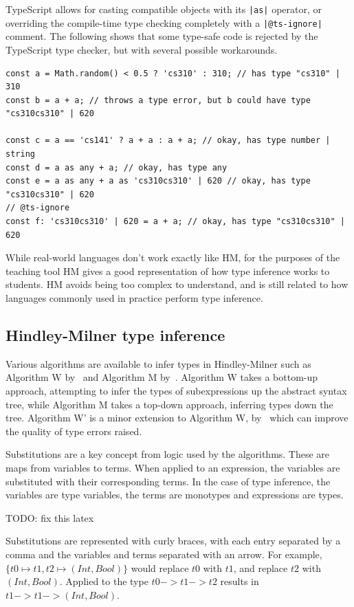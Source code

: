 \documentclass[a4paper,fleqn,12pt]{article}
\begin{document}
TypeScript allows for casting compatible objects with its \texttt{|as|} operator, or overriding the compile-time type checking completely with a \texttt{|@ts-ignore|} comment. The following shows that some type-safe code is rejected by the TypeScript type checker, but with several possible workarounds.

\begin{verbatim}
const a = Math.random() < 0.5 ? 'cs310' : 310; // has type "cs310" | 310
const b = a + a; // throws a type error, but b could have type "cs310cs310" | 620

const c = a == 'cs141' ? a + a : a + a; // okay, has type number | string
const d = a as any + a; // okay, has type any
const e = a as any + a as 'cs310cs310' | 620 // okay, has type "cs310cs310" | 620
// @ts-ignore
const f: 'cs310cs310' | 620 = a + a; // okay, has type "cs310cs310" | 620
\end{verbatim}

While real-world languages don’t work exactly like HM, for the purposes of the teaching tool HM gives a good representation of how type inference works to students. HM avoids being too complex to understand, and is still related to how languages commonly used in practice perform type inference.
\subsection{Hindley-Milner type inference}\label{id:h.admfqf7bhkct}
Various algorithms are available to infer types in Hindley-Milner such as Algorithm W by~\cite{ref26} and Algorithm M by~\cite{ref27}. Algorithm W takes a bottom-up approach, attempting to infer the types of subexpressions up the abstract syntax tree, while Algorithm M takes a top-down approach, inferring types down the tree. Algorithm W’ is a minor extension to Algorithm W, by~\cite{ref28} which can improve the quality of type errors raised.

Substitutions are a key concept from logic used by the algorithms. These are maps from variables to terms. When applied to an expression, the variables are substituted with their corresponding terms. In the case of type inference, the variables are type variables, the terms are monotypes and expressions are types.

TODO: fix this latex

Substitutions are represented with curly braces, with each entry separated by a comma and the variables and terms separated with an arrow. For example, $\{ t0 \mapsto t1, t2 \mapsto (Int, Bool) \}$ would replace $t0$ with $t1$, and replace $t2$ with $(Int, Bool)$. Applied to the type $t0 -> t1 -> t2$ results in $t1 -> t1 -> (Int, Bool)$.
\end{document}
